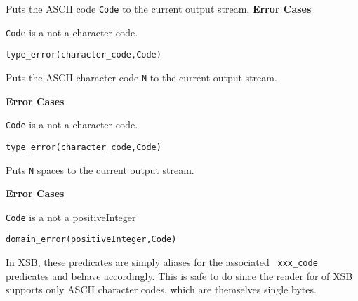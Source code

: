 \begin{description}
%
Puts the ASCII code {\tt Code} to the current output stream.
{\bf Error Cases}
\bi
\item 	{\tt Code} is a not a character code.
\bi
\item 	{\tt type\_error(character\_code,Code)}
\ei
\ei

    Puts the ASCII character code {\tt N} to the current output stream.

{\bf Error Cases}
\bi
\item 	{\tt Code} is a not a character code.
\bi
\item 	{\tt type\_error(character\_code,Code)}
\ei
\ei

    Puts {\tt N} spaces to the current output stream. 

{\bf Error Cases}
\bi
\item 	{\tt Code} is a not a positiveInteger
\bi
\item 	{\tt domain\_error(positiveInteger,Code)}
\ei
\ei

%
In XSB, these predicates are simply aliases for the associated {\tt
  xxx\_code} predicates and behave accordingly.  This is safe to do
since the reader for \version{} of XSB supports only ASCII character
codes, which are themselves single bytes.  
%
\end{description}

